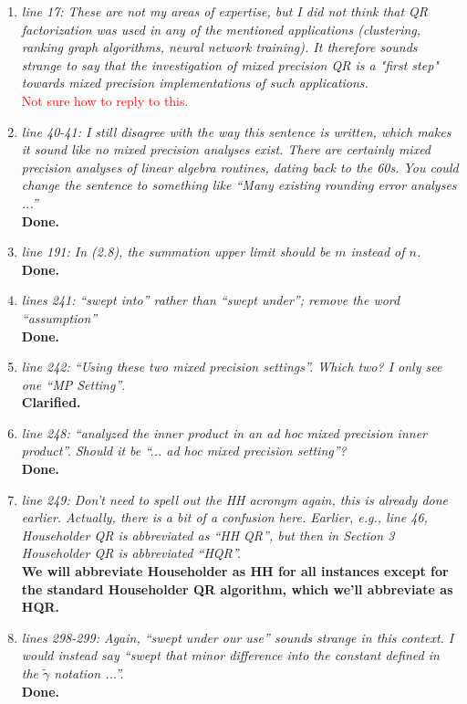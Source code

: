 \documentclass[final,onefignum,onetabnum]{siamart190516}
\newcommand{\red}[1]{\textcolor{red}{#1}}
\begin{document}
\begin{enumerate}
	\item {\it line 17: These are not my areas of expertise, but I did not think that QR factorization was used in any of the mentioned applications (clustering, ranking graph algorithms, neural network training). It therefore sounds strange to say that the investigation of mixed precision QR is a "first step" towards mixed precision implementations of such applications.}\\
	\red{ Not sure how to reply to this. }
	
	\item {\it line 40-41: I still disagree with the way this sentence is written, which makes it sound like no mixed precision analyses exist. There are certainly mixed precision analyses of linear algebra routines, dating back to the 60s. You could change the sentence to something like ``Many existing rounding error analyses ...''}\\
	{\bf Done.}
	
	\item {\it line 191: In (2.8), the summation upper limit should be $m$ instead of $n$.}\\
	{\bf Done.}
	
	\item {\it lines 241: ``swept into'' rather than ``swept under''; remove the word ``assumption''}\\
	{\bf Done.}
	
	\item {\it line 242: ``Using these two mixed precision settings''. Which two? I only see one ``MP Setting''}.\\
	{\bf Clarified.}
	
	\item {\it line 248: ``analyzed the inner product in an ad hoc mixed precision inner product''. Should it be ``... ad hoc mixed precision setting''?}\\
	{\bf Done.}
	
	\item {\it line 249: Don't need to spell out the HH acronym again, this is already done earlier. Actually, there is a bit of a confusion here. Earlier, e.g., line 46, Householder QR is abbreviated as ``HH QR'', but then in Section 3 Householder QR is abbreviated ``HQR''. }\\
	{\bf We will abbreviate Householder as HH for all instances except for the standard Householder QR algorithm, which we'll abbreviate as HQR.}
	
	\item {\it lines 298-299: Again, ``swept under our use'' sounds strange in this context. I would instead say ``swept that minor difference into the constant defined in the $\tilde{\gamma}$ notation ...''.}\\
	{\bf Done.}
	

\end{enumerate}
\end{document}
